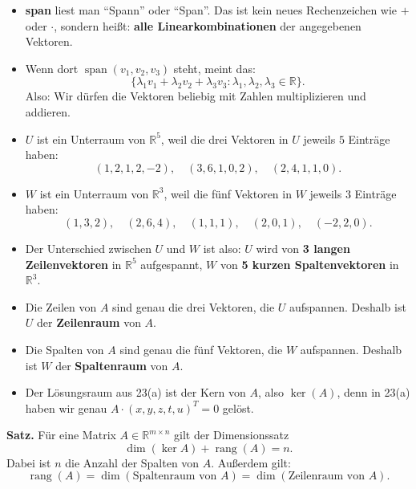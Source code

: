 \documentclass[a4paper,12pt]{article}
\begin{document}
\begin{begriffe}
\begin{itemize}[leftmargin=*, nosep]
    \item \textbf{span} liest man ``Spann'' oder ``Span''. Das ist kein neues Rechenzeichen wie $+$ oder $\cdot$, sondern hei\ss t: \textbf{alle Linearkombinationen} der angegebenen Vektoren.
    \item Wenn dort $\operatorname{span}(v_1,v_2,v_3)$ steht, meint das:
    \[
    \{\lambda_1v_1+\lambda_2v_2+\lambda_3v_3 : \lambda_1,\lambda_2,\lambda_3\in\mathbb{R}\}.
    \]
    Also: Wir d\"urfen die Vektoren beliebig mit Zahlen multiplizieren und addieren.
    \item $U$ ist ein Unterraum von $\mathbb{R}^5$, weil die drei Vektoren in $U$ jeweils $5$ Eintr\"age haben:
    \[
    (1,2,1,2,-2),\quad (3,6,1,0,2),\quad (2,4,1,1,0).
    \]
    \item $W$ ist ein Unterraum von $\mathbb{R}^3$, weil die f\"unf Vektoren in $W$ jeweils $3$ Eintr\"age haben:
    \[
    (1,3,2),\quad (2,6,4),\quad (1,1,1),\quad (2,0,1),\quad (-2,2,0).
    \]
    \item Der Unterschied zwischen $U$ und $W$ ist also: $U$ wird von \textbf{3 langen Zeilenvektoren} in $\mathbb{R}^5$ aufgespannt, $W$ von \textbf{5 kurzen Spaltenvektoren} in $\mathbb{R}^3$.
    \item Die Zeilen von $A$ sind genau die drei Vektoren, die $U$ aufspannen. Deshalb ist $U$ der \textbf{Zeilenraum} von $A$.
    \item Die Spalten von $A$ sind genau die f\"unf Vektoren, die $W$ aufspannen. Deshalb ist $W$ der \textbf{Spaltenraum} von $A$.
    \item Der L\"osungsraum aus 23(a) ist der Kern von $A$, also $\ker(A)$, denn in 23(a) haben wir genau $A\cdot(x,y,z,t,u)^T=0$ gel\"ost.
\end{itemize}
\end{begriffe}

\textbf{Satz.}
F\"ur eine Matrix $A\in\mathbb{R}^{m\times n}$ gilt der Dimensionssatz
\[
\dim(\ker A)+\operatorname{rang}(A)=n.
\]
Dabei ist $n$ die Anzahl der Spalten von $A$.
Au\ss erdem gilt:
\[
\operatorname{rang}(A)
= \dim(\text{Spaltenraum von }A)
= \dim(\text{Zeilenraum von }A).
\]
\end{document}
